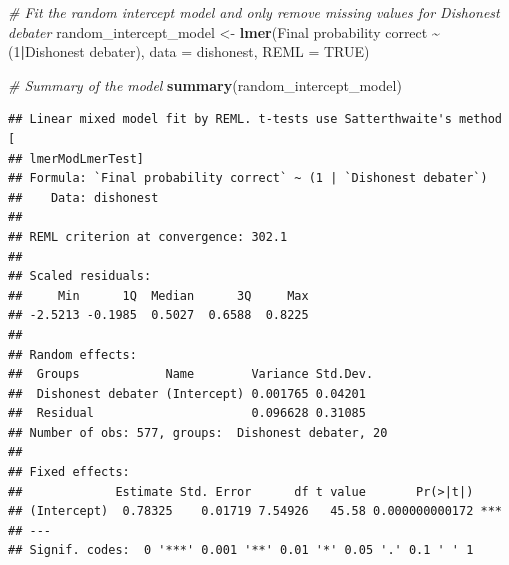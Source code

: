 \documentclass[
]{article}
\newenvironment{Shaded}{\begin{snugshade}}{\end{snugshade}}
\newcommand{\AttributeTok}[1]{\textcolor[rgb]{0.13,0.29,0.53}{#1}}
\newcommand{\CommentTok}[1]{\textcolor[rgb]{0.56,0.35,0.01}{\textit{#1}}}
\newcommand{\ConstantTok}[1]{\textcolor[rgb]{0.56,0.35,0.01}{#1}}
\newcommand{\DecValTok}[1]{\textcolor[rgb]{0.00,0.00,0.81}{#1}}
\newcommand{\FunctionTok}[1]{\textcolor[rgb]{0.13,0.29,0.53}{\textbf{#1}}}
\newcommand{\NormalTok}[1]{#1}
\newcommand{\OtherTok}[1]{\textcolor[rgb]{0.56,0.35,0.01}{#1}}
\newcommand{\SpecialCharTok}[1]{\textcolor[rgb]{0.81,0.36,0.00}{\textbf{#1}}}
\newcommand{\StringTok}[1]{\textcolor[rgb]{0.31,0.60,0.02}{#1}}
\begin{document}
\begin{Shaded}
\begin{Highlighting}[]
\CommentTok{\# Fit the random intercept model and only remove missing values for \textquotesingle{}Dishonest debater\textquotesingle{}}
\NormalTok{random\_intercept\_model }\OtherTok{\textless{}{-}} \FunctionTok{lmer}\NormalTok{(}\StringTok{\textasciigrave{}}\AttributeTok{Final probability correct}\StringTok{\textasciigrave{}} \SpecialCharTok{\textasciitilde{}}\NormalTok{ (}\DecValTok{1}\SpecialCharTok{|}\StringTok{\textasciigrave{}}\AttributeTok{Dishonest debater}\StringTok{\textasciigrave{}}\NormalTok{), }
                                \AttributeTok{data =}\NormalTok{ dishonest, }
                                \AttributeTok{REML =} \ConstantTok{TRUE}\NormalTok{)}

\CommentTok{\# Summary of the model}
\FunctionTok{summary}\NormalTok{(random\_intercept\_model)}
\end{Highlighting}
\end{Shaded}

\begin{verbatim}
## Linear mixed model fit by REML. t-tests use Satterthwaite's method [
## lmerModLmerTest]
## Formula: `Final probability correct` ~ (1 | `Dishonest debater`)
##    Data: dishonest
## 
## REML criterion at convergence: 302.1
## 
## Scaled residuals: 
##     Min      1Q  Median      3Q     Max 
## -2.5213 -0.1985  0.5027  0.6588  0.8225 
## 
## Random effects:
##  Groups            Name        Variance Std.Dev.
##  Dishonest debater (Intercept) 0.001765 0.04201 
##  Residual                      0.096628 0.31085 
## Number of obs: 577, groups:  Dishonest debater, 20
## 
## Fixed effects:
##             Estimate Std. Error      df t value       Pr(>|t|)    
## (Intercept)  0.78325    0.01719 7.54926   45.58 0.000000000172 ***
## ---
## Signif. codes:  0 '***' 0.001 '**' 0.01 '*' 0.05 '.' 0.1 ' ' 1
\end{verbatim}

\begin{Shaded}
\end{Shaded}
\end{document}

